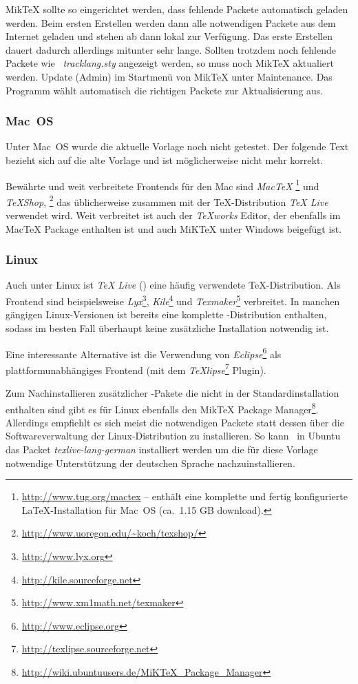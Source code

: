 MikTeX sollte so eingerichtet werden, dass fehlende Packete automatisch geladen werden. Beim ersten Erstellen werden dann alle notwendigen Packete aus dem Internet geladen und stehen ab dann lokal zur Verfügung. Das erste Erstellen dauert dadurch allerdings mitunter sehr lange. Sollten trotzdem noch fehlende Packete wie \zB\ \emph{tracklang.sty} angezeigt werden, so muss noch MikTeX aktualiert werden. Update (Admin) im Startmenü von MikTeX unter Maintenance. Das Programm wählt automatisch die richtigen Packete zur Aktualisierung aus.

\subsubsection{Mac~OS}

Unter Mac~OS wurde die aktuelle Vorlage noch nicht getestet. Der folgende Text bezieht sich auf die alte Vorlage und ist möglicherweise nicht mehr korrekt.

Bewährte und weit verbreitete Frontends für den Mac sind \emph{MacTeX}%
\footnote{\url{http://www.tug.org/mactex} -- enthält eine komplette und fertig
konfigurierte LaTeX-Installation für Mac~OS (ca.\ 1.15 GB download).}
und \emph{TeXShop},%
\footnote{\url{http://www.uoregon.edu/~koch/texshop/}}
das üblicherweise zusammen mit der TeX-Distribution \emph{TeX Live} verwendet wird. 
Weit verbreitet ist auch der \emph{TeXworks} Editor, der ebenfalls im MacTeX Package enthalten ist und auch MiKTeX unter Windows beigefügt ist.


\subsubsection{Linux}

Auch unter Linux ist \emph{TeX Live} (\so) eine häufig verwendete TeX-Distri\-bution. 
Als Frontend sind beispielsweise
\emph{Lyx}\footnote{\url{http://www.lyx.org}},
\emph{Kile}\footnote{\url{http://kile.sourceforge.net}} und
\emph{Texmaker}\footnote{\url{http://www.xm1math.net/texmaker}} 
verbreitet.
In manchen gängigen Linux-Versionen ist bereits eine komplette \latex-Distribution enthalten, sodass im besten Fall überhaupt keine zusätzliche Installation notwendig ist.  

Eine interessante Alternative ist die Verwendung von
\emph{Eclipse}\footnote{\url{http://www.eclipse.org}} als plattformunabhängiges Frontend 
(mit dem \emph{TeXlipse}\footnote{\url{http://texlipse.sourceforge.net}}
Plugin).


Zum Nachinstallieren zusätzlicher \latex-Pakete die nicht in der
Standardinstallation enthalten sind gibt es für Linux ebenfalls den MikTeX
Package Manager\footnote{\url{http://wiki.ubuntuusers.de/MiKTeX_Package_Manager}}. Allerdings empfiehlt es sich meist die notwendigen Packete statt dessen über die Softwareverwaltung der Linux-Distribution zu installieren. So kann \zB\ in Ubuntu das Packet \emph{texlive-lang-german} installiert werden um die für diese Vorlage notwendige Unterstützung der deutschen Sprache nachzuinstallieren.


